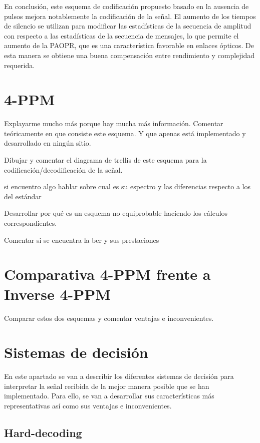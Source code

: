 En conclusión, este esquema de codificación propuesto basado en la ausencia de pulsos
mejora notablemente la codificación de la señal.
El aumento de los tiempos de silencio se utilizan para modificar las estadísticas de
la secuencia de amplitud con respecto a las estadísticas de la
secuencia de mensajes, lo que permite el aumento de la PAOPR,
que es una característica favorable en enlaces ópticos. De esta manera se 
obtiene una buena compensación entre rendimiento y complejidad requerida.

\section{4-PPM}
Explayarme mucho más porque hay mucha más información.
Comentar teóricamente en que consiste este esquema.
Y que apenas está implementado y desarrollado en ningún sitio.

Dibujar y comentar el diagrama de trellis de este esquema para la codificación/decodificación de la señal.

si encuentro algo hablar sobre cual es su espectro y las diferencias respecto a los del estándar

Desarrollar por qué es un esquema no equiprobable haciendo los cálculos correspondientes.

Comentar si se encuentra la ber y sus prestaciones

\section{Comparativa 4-PPM frente a Inverse 4-PPM}
Comparar estos dos esquemas y comentar ventajas e inconvenientes.

\section{Sistemas de decisión}
En este apartado se van a describir los diferentes sistemas de decisión para interpretar la señal recibida de la mejor 
manera posible que se han implementado. Para ello, se van a desarrollar 
sus características más representativas así como sus ventajas e inconvenientes.

\subsection{Hard-decoding}


